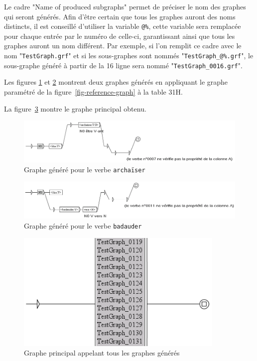 \bigskip
\noindent  Le cadre "Name of produced subgraphs" permet de préciser le nom des graphes qui seront
générés. Afin d’être certain que tous les graphes auront des noms distincts, il est conseillé
d’utiliser la variable \verb+@%+, cette variable sera remplacée pour chaque entrée par le numéro de
celle-ci, garantissant ainsi que tous les graphes auront un nom différent. Par exemple, si l’on
remplit ce cadre avec le nom "\verb+TestGraph.grf+" et si les sous-graphes sont nommés
"\verb+TestGraph_@%.grf+", le sous-graphe généré à partir de la 16{\ieme}    ligne sera nommé  
"\verb+TestGraph_0016.grf+".

\bigskip
\noindent Les figures \ref{fig-archaiser} et \ref{fig-badauder} montrent deux graphes générés
en appliquant le graphe paramétré de la figure~\ref{fig-reference-graph} à la table 31H.

\bigskip
\noindent La figure~\ref{fig-main-graph} montre le graphe principal obtenu.

\begin{figure}[!h]
\begin{center}
\includegraphics[width=15cm]{resources/img/fig8-8.png}
\caption{Graphe généré pour le verbe
\texttt{archa\"iser}\label{fig-archaiser}}
\end{center}
\end{figure}

\begin{figure}[!h]
\begin{center}
\includegraphics[width=15cm]{resources/img/fig8-9.png}
\caption{Graphe généré pour le verbe \texttt{badauder}\label{fig-badauder}}
\end{center}
\end{figure}

\begin{figure}[!h]
\begin{center}
\includegraphics[width=10cm]{resources/img/fig8-10.png}
\caption{Graphe principal appelant tous les graphes générés\label{fig-main-graph}}
\end{center}
\end{figure}


